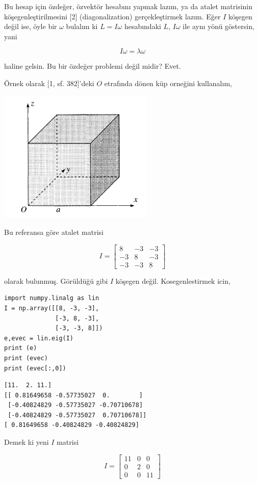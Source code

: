 \documentclass[12pt,fleqn]{article}\usepackage{../../common}
\begin{document}
Bu hesap için özdeğer, özvektör hesabını yapmak lazım, ya da atalet matrisinin
köşegenleştirilmesini [2] (diagonalization) gerçekleştirmek lazım. Eğer $I$
köşegen değil ise, öyle bir $\omega$ bulalım ki $L = I \omega$ hesabındaki
$L$, $I \omega$ ile aynı yönü göstersin, yani

$$
I\omega = \lambda \omega
$$

haline gelsin. Bu bir özdeğer problemi değil midir? Evet. 

Örnek olarak [1, sf. 382]'deki $O$ etrafında dönen küp orneğini kullanalım,

\includegraphics[width=20em]{phy_005_basics_04_01.png}

Bu referansa göre atalet matrisi

$$
I = \left[\begin{array}{rrr}
8 & -3 & -3 \\
-3 & 8 & -3 \\
-3 & -3 & 8
\end{array}\right]
$$

olarak bulunmuş. Görüldüğü gibi $I$ köşegen değil. Kosegenlestirmek icin,

\begin{verbatim}
import numpy.linalg as lin
I = np.array([[8, -3, -3],
              [-3, 8, -3],
              [-3, -3, 8]])
e,evec = lin.eig(I)
print (e)
print (evec)
print (evec[:,0])
\end{verbatim}

\begin{verbatim}
[11.  2. 11.]
[[ 0.81649658 -0.57735027  0.        ]
 [-0.40824829 -0.57735027 -0.70710678]
 [-0.40824829 -0.57735027  0.70710678]]
[ 0.81649658 -0.40824829 -0.40824829]
\end{verbatim}

Demek ki yeni $I$ matrisi

$$
I = \left[\begin{array}{rrr}
11 & 0 & 0 \\
0 & 2 & 0 \\
0 & 0 & 11 
\end{array}\right]
$$
\end{document}
